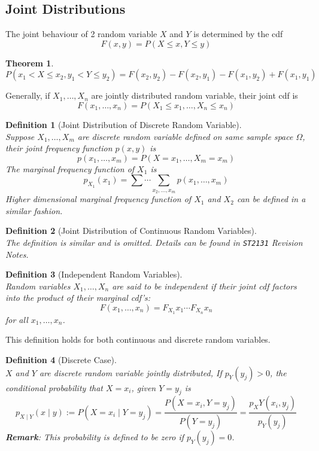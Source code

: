 \documentclass[12pt]{article}
\newtheorem{definition}{Definition}[section]
\newtheorem{theorem}{Theorem}[section]
\theoremstyle{definition}
\begin{document}
\subsection{Joint Distributions}
The joint behaviour of 2 random variable $X$ and $Y$ is determined by the cdf
\[
F(x,y) = P(X\leq x, Y\leq y)
\]
\begin{theorem}
\[
P(x_1<X\leq x_2, y_1<Y\leq y_2) = F(x_2, y_2)-F(x_2, y_1)-F(x_1, y_2)+F(x_1, y_1)
\]
\end{theorem}
Generally, if $X_1,\ldots, X_n$ are jointly distributed random variable, their joint cdf is
\[
F(x_1, \ldots, x_n) = P(X_1\leq x_1, \ldots, X_n\leq x_n)
\]
\begin{definition}[Joint Distribution of Discrete Random Variable]
\hfill\\\normalfont Suppose $X_1,\ldots, X_m$ are discrete random variable defined on same sample space $\Omega$, their joint frequency function $p(x,y)$ is
\[
p(x_1, \ldots, x_m) = P(X=x_1,\ldots,  X_m=x_m)
\]
The marginal frequency function of $X_1$ is
\[
p_{X_1}(x_1) = \sum\cdots\sum_{x_2,\ldots,x_m} p(x_1, \ldots, x_m)
\]
Higher dimensional marginal frequency function of $X_1$ and $X_2$ can be defined in a similar fashion.
\end{definition}
\begin{definition}[Joint Distribution of Continuous Random Variables]
\hfill\\\normalfont The definition is similar and is omitted. Details can be found in \texttt{ST2131} Revision Notes.
\end{definition}
\begin{definition}[Independent Random Variables]
\hfill\\\normalfont Random variables $X_1, \ldots, X_n$ are said to be independent if their joint cdf factors into the product of their marginal cdf's:
\[
F(x_1, \ldots, x_n) = F_{X_1}{x_1}\cdots F_{X_n}{x_n}
\]
for all $x_1,\ldots, x_n$.
\end{definition}
This definition holds for both continuous and discrete random variables.
\begin{definition}[Discrete Case]
\hfill\\\normalfont $X$ and $Y$ are discrete random variable jointly distributed, If $p_Y(y_j)>0$, the conditional probability that $X=x_i$, given 
 $Y=y_j$ is
 \[
p_{X\mid Y}(x\mid y) := P(X=x_i\mid Y=y_j) = \frac{P(X=x_i, Y=y_j)}{P(Y=y_j)} = \frac{p_XY(x_i, y_j)}{p_Y(y_j)}
 \]
\textbf{Remark}: This probability is defined to be zero if $p_Y(y_j) = 0$.\\
\end{definition}
\end{document}
